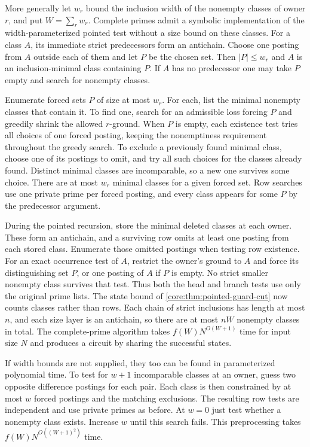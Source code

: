 More generally let $w_r$ bound the inclusion width
of the nonempty classes of owner $r$, and put
$W=\sum_r w_r$. Complete primes admit a symbolic
implementation of the width-parameterized pointed
test without a size bound on these classes.
For a class $A$, its immediate strict predecessors
form an antichain. Choose one posting from $A$
outside each of them and let $P$ be the chosen set.
Then $|P|\le w_r$ and $A$ is an inclusion-minimal
class containing $P$. If $A$ has no predecessor
one may take $P$ empty and search for nonempty
classes.

Enumerate forced sets $P$ of size at most $w_r$.
For each, list the minimal nonempty classes that
contain it. To find one, search for an admissible
loss forcing $P$ and greedily shrink the allowed
$r$-ground. When $P$ is empty, each existence test
tries all choices of one forced posting, keeping
the nonemptiness requirement throughout the greedy
search. To exclude a previously found
minimal class, choose one of its postings to
omit, and try all such choices for the classes
already found. Distinct minimal classes are
incomparable, so a new one survives some choice.
There are at most $w_r$ minimal classes for a
given forced set. Row searches use one private
prime per forced posting, and every class appears
for some $P$ by the predecessor argument.

During the pointed recursion, store the minimal
deleted classes at each owner. These form an
antichain, and a surviving row omits at least one
posting from each stored class. Enumerate those
omitted postings when testing row existence.
For an exact occurrence test of $A$, restrict the
owner's ground to $A$ and force its distinguishing
set $P$, or one posting of $A$ if $P$ is empty.
No strict smaller nonempty class survives that
test. Thus both the head and branch tests use
only the original prime lists. The state bound
of \cref{core:thm:pointed-guard-cut} now counts
classes rather than rows. Each chain of strict
inclusions has length at most $n$, and each size
layer is an antichain, so there are at most $nW$
nonempty classes in total. The complete-prime
algorithm takes $f(W)N^{O(W+1)}$ time for input
size $N$ and produces a circuit by sharing the
successful states.

If width bounds are not supplied, they too can
be found in parameterized polynomial time.
To test for $w+1$ incomparable classes at an
owner, guess two opposite difference postings
for each pair. Each class is then constrained
by at most $w$ forced postings and the matching
exclusions. The resulting row tests are independent
and use private primes as before. At $w=0$ just
test whether a nonempty class exists. Increase $w$
until this search fails. This preprocessing
takes $f(W)N^{O((W+1)^2)}$ time.

